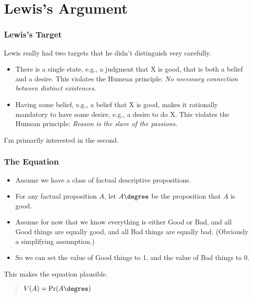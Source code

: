 \section{Lewis's Argument}
\label{lewissargument}

\begin{frame}[fragile]
\frametitle{Lewis's Target}
\label{lewisstarget}

Lewis really had two targets that he didn't distinguish very carefully.

\begin{itemize}
\item{} There is a single state, e.g., a judgment that X is good, that is both a belief and a desire. This violates the Humean principle: \emph{No necessary connection between distinct existences}. \pause 

\item{} Having some belief, e.g., a belief that X is good, makes it rationally mandatory to have some desire, e.g., a desire to do X. This violates the Humean principle: \emph{Reason is the slave of the passions}. \pause 

\end{itemize}

I'm primarily interested in the second.

\end{frame}

\begin{frame}[fragile]
\frametitle{The Equation}
\label{theequation}

\begin{itemize}
\item{} Assume we have a class of factual descriptive propositions.

\item{} For any factual proposition $A$, let $A\degree$ be the proposition that $A$ is good. \pause 

\item{} Assume for now that we know everything is either Good or Bad, and all Good things are equally good, and all Bad things are equally bad. (Obviously a simplifying assumption.)

\item{} So we can set the value of Good things to 1, and the value of Bad things to 0. \pause 

\end{itemize}

This makes the equation plausible.

\begin{quote}
$V(A) = \Pr(A\degree)$
\end{quote}

\end{frame}


